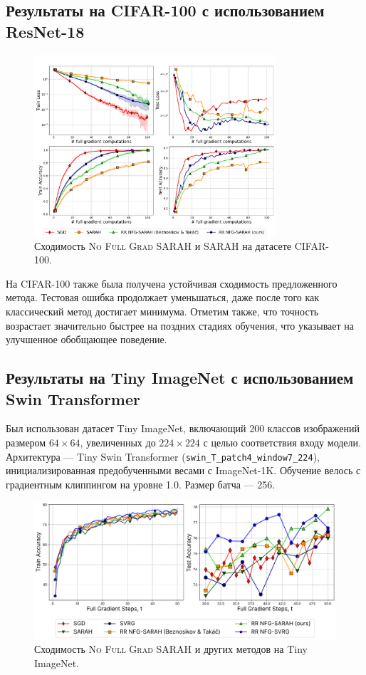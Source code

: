 \subsection{Результаты на \textsc{CIFAR-100} с использованием ResNet-18}
\begin{figure}[H]
\centering
\includegraphics[width=0.8\textwidth]{plots/CIFAR100_LR=0.7_plots_compressed.pdf}
\caption{Сходимость \textsc{No Full Grad SARAH} и \textsc{SARAH} на датасете CIFAR-100.}
\label{fig:sarah_100}
\end{figure}

На CIFAR-100 также была получена устойчивая сходимость предложенного метода. Тестовая ошибка продолжает уменьшаться, даже после того как классический метод достигает минимума. Отметим также, что точность возрастает значительно быстрее на поздних стадиях обучения, что указывает на улучшенное обобщающее поведение.

\subsection{Результаты на Tiny ImageNet с использованием Swin Transformer}

Был использован датасет Tiny ImageNet, включающий 200 классов изображений размером $64\times64$, увеличенных до $224\times224$ с целью соответствия входу модели. Архитектура — Tiny Swin Transformer (\texttt{swin\_T\_patch4\_window7\_224}), инициализированная предобученными весами с ImageNet-1K. Обучение велось с градиентным клиппингом на уровне 1.0. Размер батча — 256.

\begin{figure}[H]
\centering
\includegraphics[width=\textwidth]{plots/vit_results.pdf}
\caption{Сходимость \textsc{No Full Grad SARAH} и других методов на Tiny ImageNet.}
\label{fig:swin_plots}
\end{figure}

